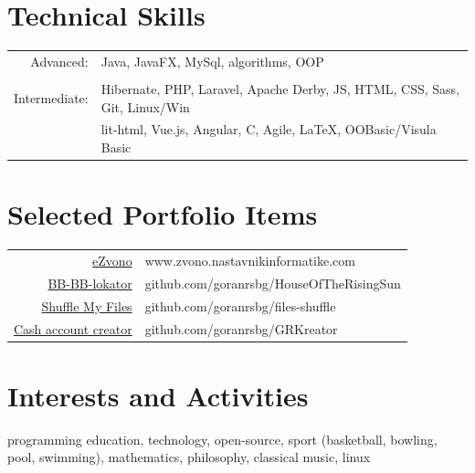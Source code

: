 \documentclass[a4paper,11pt]{article}
\begin{document}
{  \section*{Technical Skills}
  
  \begin{tabular}{r|l}
    Advanced: & Java, JavaFX, MySql, algorithms, OOP\\
     \multicolumn{2}{c}{} \\
    Intermediate:  & Hibernate, PHP, Laravel, Apache Derby, JS,  HTML, CSS, Sass, Git, Linux/Win\\ 
              & lit-html, Vue.js, Angular, C, Agile, {\LaTeX}, OOBasic/Visula Basic\\

  \end{tabular}
  
  \section*{Selected Portfolio Items}
    
    \begin{tabular}{r|l}
    
      \href{http://www.zvono.nastavnikinformatike.com}{\textcolor{links}{eZvono}} & www.zvono.nastavnikinformatike.com\\
      \href{https://github.com/goranrsbg/HouseOfTheRisingSun}{\textcolor{links}{BB-BB-lokator}} & github.com/goranrsbg/HouseOfTheRisingSun\\
      \href{https://github.com/goranrsbg/files-shuffle}{\textcolor{links}{Shuffle My Files}} & github.com/goranrsbg/files-shuffle\\
      \href{https://github.com/goranrsbg/GRKreator}{\textcolor{links}{Cash account creator}} & github.com/goranrsbg/GRKreator\\
    
    \end{tabular}
    
  \section*{Interests and Activities}

   programming education, technology, open-source, sport (basketball, bowling, pool, swimming),
   mathematics, philosophy, classical music, linux
  
}
\end{document}

